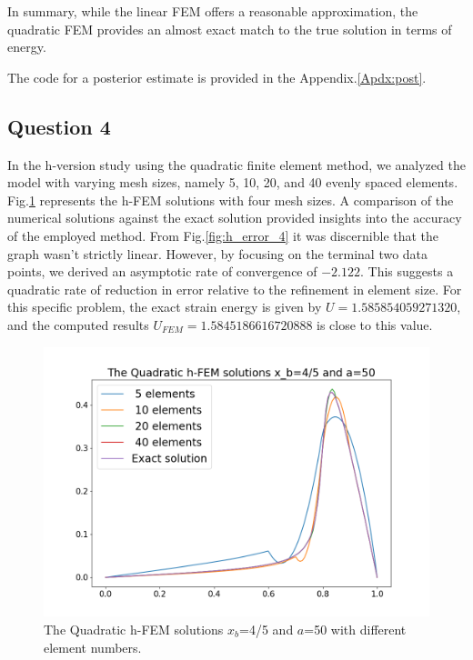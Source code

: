 \documentclass[twoside,twocolumn,10pt]{article}
\begin{document}
In summary, while the linear FEM offers a reasonable approximation, the quadratic FEM provides an almost exact match to the true solution in terms of energy.

The code for a posterior estimate is provided in the Appendix.\ref{Apdx:post}.

\subsection{Question 4}
In the h-version study using the quadratic finite element method, we analyzed the model with varying mesh sizes, namely 5, 10, 20, and 40 evenly spaced elements. Fig.\ref{fig:q_4} represents the h-FEM solutions with four mesh sizes. A comparison of the numerical solutions against the exact solution provided insights into the accuracy of the employed method. From Fig.\ref{fig:h_error_4} it was discernible that the graph wasn't strictly linear. However, by focusing on the terminal two data points, we derived an asymptotic rate of convergence of \(-2.122\). This suggests a quadratic rate of reduction in error relative to the refinement in element size. For this specific problem, the exact strain energy is given by \( U = 1.585854059271320 \), and the computed results $U_{FEM} = 1.5845186616720888$ is close to this value.  

\begin{figure}[!ht]
  \centering
  \includegraphics[width=1.\linewidth]{Q1/Q1_4.png}
  \caption{The Quadratic h-FEM solutions $x_b$=4/5 and $a$=50 with different element numbers.}
  \label{fig:q_4}
\end{figure}
\end{document}
